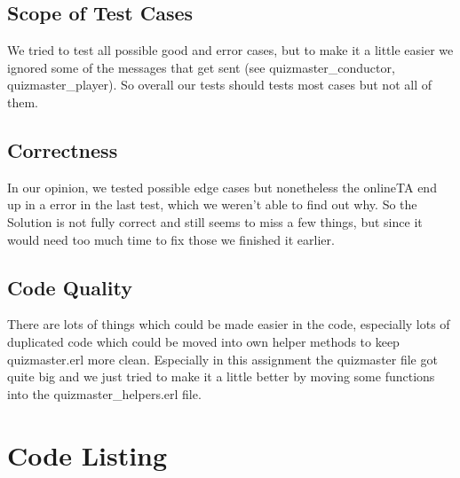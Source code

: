 \documentclass[12pt,a4paper]{article}
\begin{document}
\subsection{Scope of Test Cases}
We tried to test all possible good and error cases, but to make it a little easier we ignored some of the messages that get sent (see quizmaster\_conductor, quizmaster\_player).
So overall our tests should tests most cases but not all of them.

\subsection{Correctness}
In our opinion, we tested possible edge cases but nonetheless the onlineTA end up in a error in the last test, which we weren't able to find out why.
So the Solution is not fully correct and still seems to miss a few things, but since it would need too much time to fix those we finished it earlier.

\subsection{Code Quality}
There are lots of things which could be made easier in the code, especially lots of duplicated code which could be moved into own helper methods to keep quizmaster.erl more clean.
Especially in this assignment the quizmaster file got quite big and we just tried to make it a little better by moving some functions into the quizmaster\_helpers.erl file.

\appendix
\section{Code Listing}
\inputminted{erlang}{handin/src/quizmaster.erl}
\inputminted{erlang}{handin/src/quizmaster_helpers.erl}
\end{document}
